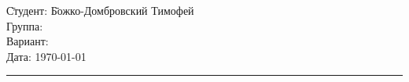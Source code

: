 \begin{tabbing}
	\hspace{11cm} \= Студент: \= Божко-Домбровский Тимофей \\																			
	\> Группа:  \\
	\> Вариант:  \\	
	\> Дата: \> \today
\end{tabbing}
\hrule
\vspace{1cm}